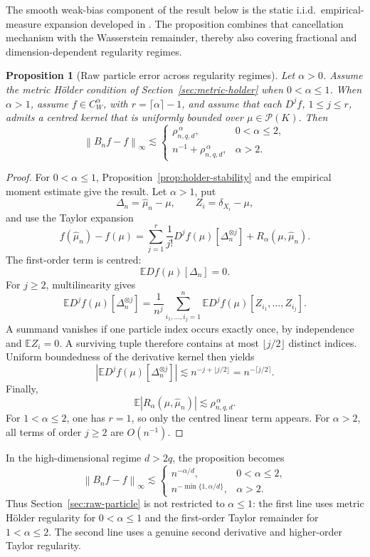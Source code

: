 \documentclass[11pt]{article}
\newtheorem{proposition}{Proposition}
\newcommand{\Pcal}{\mathcal P}
\newcommand{\E}{\mathbb E}
\newcommand{\norm}[1]{\left\lVert #1\right\rVert}
\begin{document}
The smooth weak-bias component of the result below is the static
i.i.d.\ empirical-measure expansion developed in
\cite{chassagneux-szpruch-tse}. The proposition combines that
cancellation mechanism with the Wasserstein remainder, thereby also
covering fractional and dimension-dependent regularity regimes.

\begin{proposition}[Raw particle error across regularity regimes]
Let \(\alpha>0\). Assume the metric Hölder condition of
Section~\ref{sec:metric-holder}
when \(0<\alpha\leq1\). When \(\alpha>1\), assume
\(f\in C_W^\alpha\), with \(r=\lceil\alpha\rceil-1\), and assume that
each \(D^jf\), \(1\leq j\leq r\), admits a centred kernel that is
uniformly bounded over \(\mu\in\Pcal(K)\). Then
\[
\boxed{
\norm{B_nf-f}_\infty
\lesssim
\begin{cases}
\rho_{n,q,d}^{\,\alpha},
&0<\alpha\leq2,\\[1mm]
n^{-1}+\rho_{n,q,d}^{\,\alpha},
&\alpha>2.
\end{cases}
}
\]
\end{proposition}

\begin{proof}
For \(0<\alpha\leq1\), Proposition~\ref{prop:holder-stability} and the
empirical moment estimate give the result. Let \(\alpha>1\), put
\[
\Delta_n=\widehat\mu_n-\mu,
\qquad
Z_i=\delta_{X_i}-\mu,
\]
and use the Taylor expansion
\[
f(\widehat\mu_n)-f(\mu)
=
\sum_{j=1}^r
\frac1{j!}D^jf(\mu)[\Delta_n^{\otimes j}]
+
R_\alpha(\mu,\widehat\mu_n).
\]
The first-order term is centred:
\[
\E Df(\mu)[\Delta_n]=0.
\]
For \(j\geq2\), multilinearity gives
\[
\E D^jf(\mu)[\Delta_n^{\otimes j}]
=
\frac1{n^j}
\sum_{i_1,\ldots,i_j=1}^n
\E D^jf(\mu)[Z_{i_1},\ldots,Z_{i_j}].
\]
A summand vanishes if one particle index occurs exactly once, by
independence and \(\E Z_i=0\). A surviving tuple therefore contains at
most \(\lfloor j/2\rfloor\) distinct indices. Uniform boundedness of
the derivative kernel then yields
\[
\left|
\E D^jf(\mu)[\Delta_n^{\otimes j}]
\right|
\lesssim
n^{-j+\lfloor j/2\rfloor}
=
n^{-\lceil j/2\rceil}.
\]
Finally,
\[
\E|R_\alpha(\mu,\widehat\mu_n)|
\lesssim
\rho_{n,q,d}^{\,\alpha}.
\]
For \(1<\alpha\leq2\), one has \(r=1\), so only the centred linear term
appears. For \(\alpha>2\), all terms of order \(j\geq2\) are
\(O(n^{-1})\).
\end{proof}

In the high-dimensional regime \(d>2q\), the proposition becomes
\[
\boxed{
\norm{B_nf-f}_\infty
\lesssim
\begin{cases}
n^{-\alpha/d},&0<\alpha\leq2,\\[1mm]
n^{-\min\{1,\alpha/d\}},&\alpha>2.
\end{cases}
}
\]
Thus Section~\ref{sec:raw-particle} is not restricted to
\(\alpha\leq1\): the first line
uses metric Hölder regularity for \(0<\alpha\leq1\) and the
first-order Taylor remainder for \(1<\alpha\leq2\). The second line
uses a genuine second derivative and higher-order Taylor regularity.
\end{document}
